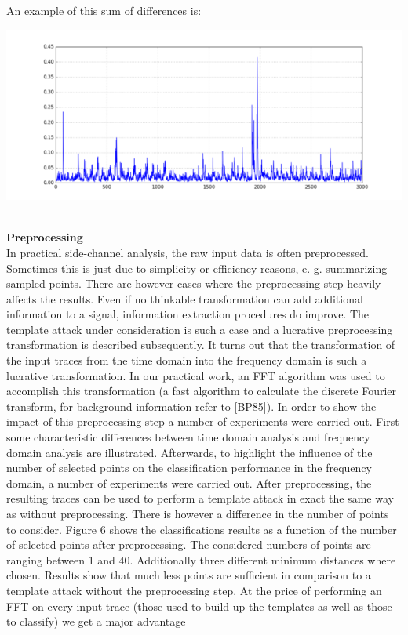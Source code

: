         An example of this sum of differences is:\\
              \begin{minipage}{\linewidth}
              \centering
              \includegraphics{images/Lecture_5/pic11.png}
              \end{minipage}
        \\

\textbf{Preprocessing}\\
    In practical side-channel analysis, the raw input data is often
    preprocessed. Sometimes this is just due to simplicity or efficiency
    reasons, e. g. summarizing sampled points. There are however cases where the
    preprocessing step heavily affects the results. Even if no thinkable
    transformation can add additional information to a signal, information
    extraction procedures do improve. The template attack under consideration is
    such a case and a lucrative preprocessing transformation is described
    subsequently. It turns out that the transformation of the input traces from
    the time domain into the frequency domain is such a lucrative
    transformation. In our practical work, an FFT algorithm was used to
    accomplish this transformation (a fast algorithm to calculate the discrete
    Fourier transform, for background information refer to [BP85]). In order to
    show the impact of this preprocessing step a number of experiments were
    carried out. First some characteristic differences between time domain
    analysis and frequency domain analysis are illustrated. Afterwards, to
    highlight the influence of the number of selected points on the
    classification performance in the frequency domain, a number of experiments
    were carried out. After preprocessing, the resulting traces can be used to
    perform a template attack in exact the same way as without preprocessing.
    There is however a difference in the number of points to consider. Figure 6
    shows the classifications results as a function of the number of selected
    points after preprocessing. The considered numbers of points are ranging
    between 1 and 40. Additionally three different minimum distances where
    chosen. Results show that much less points are sufficient in comparison to a
    template attack without the preprocessing step. At the price of performing
    an FFT on every input trace (those used to build up the templates as well as
    those to classify) we get a major advantage\\


